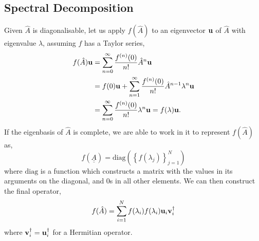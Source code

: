 \documentclass{book}
\def\doubleunderline#1{\underline{\underline{#1}}}
\begin{document}
\subsection{Spectral Decomposition}
Given $\hat{A}$ is diagonalisable, let us apply $f(\hat{A})$ to an eigenvector $\vb{u}$ of $\hat{A}$ with eigenvalue $\lambda$, assuming $f$ has a Taylor series,
\begin{equation}
	\begin{split}
		f(\hat{A})\vb{u} & = \sum_{n=0}^{\infty}\frac{f^{(n)}(0)}{n!}\hat{A}^n\vb{u} \\
		& = f(0) \vb{u} + \sum_{n=1}^{\infty}\frac{f^{(n)}(0)}{n!}\hat{A}^{n-1}\lambda^n\vb{u} \\
		& = \sum_{n=0}^{\infty}\frac{f^{(n)}(0)}{n!}\lambda^n\vb{u} = f(\lambda)\vb{u}.
	\end{split}
\end{equation}
If the eigenbasis of $\hat{A}$ is complete, we are able to work in it to represent $f(\hat{A})$ as,
\begin{equation}
	f(\doubleunderline{A}) = \text{diag}\left(\left\{f(\lambda_j)\right\}_{j=1}^N\right)
\end{equation}
where $\text{diag}$ is a function which constructs a matrix with the values in its arguments on the diagonal, and 0s in all other elements. We can then construct the final operator,
\begin{equation}
	f(\hat{A}) = \sum_{i=1}^Nf(\lambda_i) f(\lambda_i)\vb{u}_i\vb{v}_i^{\dag}
\end{equation}
where $\vb{v}_i^{\dag} = \vb{u}_i^{\dag}$ for a Hermitian operator.
\end{document}
